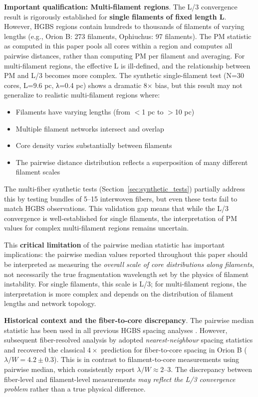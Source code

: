 \documentclass[twoside,twocolumn]{mnras}
\begin{document}
\textbf{Important qualification: Multi-filament regions}. The L/3 convergence result is rigorously established for \textbf{single filaments of fixed length L}. However, HGBS regions contain hundreds to thousands of filaments of varying lengths (e.g., Orion B: 273 filaments, Ophiuchus: 97 filaments). The PM statistic as computed in this paper pools all cores within a region and computes all pairwise distances, rather than computing PM per filament and averaging. For multi-filament regions, the effective L is ill-defined, and the relationship between PM and L/3 becomes more complex. The synthetic single-filament test (N=30 cores, L=9.6 pc, λ=0.4 pc) shows a dramatic 8× bias, but this result may not generalize to realistic multi-filament regions where:
\begin{itemize}
    \item Filaments have varying lengths (from $<$1 pc to $>$10 pc)
    \item Multiple filament networks intersect and overlap
    \item Core density varies substantially between filaments
    \item The pairwise distance distribution reflects a superposition of many different filament scales
\end{itemize}
The multi-fiber synthetic tests (Section~\ref{sec:synthetic_tests}) partially address this by testing bundles of 5--15 interwoven fibers, but even these tests fail to match HGBS observations. This validation gap means that while the L/3 convergence is well-established for single filaments, the interpretation of PM values for complex multi-filament regions remains uncertain.

This \textbf{critical limitation} of the pairwise median statistic has important implications: the pairwise median values reported throughout this paper should be interpreted as measuring the \textit{overall scale of core distributions along filaments}, not necessarily the true fragmentation wavelength set by the physics of filament instability. For single filaments, this scale is L/3; for multi-filament regions, the interpretation is more complex and depends on the distribution of filament lengths and network topology.

\textbf{Historical context and the fiber-to-core discrepancy}. The pairwise median statistic has been used in all previous HGBS spacing analyses \citep{Arzoumanian2011, Arzoumanian2019}. However, subsequent fiber-resolved analysis by \citet{Hacar2013, Hacar2018} adopted \textit{nearest-neighbour} spacing statistics and recovered the classical $4\times$ prediction for fiber-to-core spacing in Orion B ($\lambda/W = 4.2 \pm 0.3$). This is in contrast to filament-to-core measurements using pairwise median, which consistently report $\lambda/W \approx 2$--$3$. The discrepancy between fiber-level and filament-level measurements \textit{may reflect the L/3 convergence problem} rather than a true physical difference.
\end{document}

